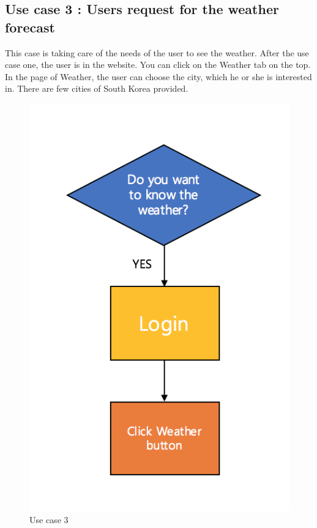 \documentclass[conference]{IEEEtran}
\begin{document}
\subsection{Use case 3 : Users request for the weather forecast} This case is taking care of the needs of the user to see the weather. After the use case one, the user is in the website. You can click on the Weather tab on the top. In the page of Weather, the user can choose the city, which he or she is interested in. There are few cities of South Korea provided.
\begin{figure}[h]
\begin{center}
    \includegraphics[scale=0.6]{usecase3}
    \caption{Use case 3} \label{fig:label}
\end{center}
\end{figure}
\end{document}
